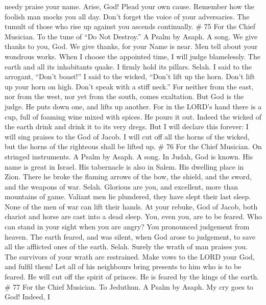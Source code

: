 needy praise your name.  Arise, God! Plead your own cause.
Remember how the foolish man mocks you all day.  Don't
forget the voice of your adversaries. The tumult of those who rise up
against you ascends continually. \# 75 For the Chief Musician. To the
tune of ``Do Not Destroy.'' A Psalm by Asaph. A song.  We
give thanks to you, God. We give thanks, for your Name is near. Men tell
about your wondrous works.  When I choose the appointed
time, I will judge blamelessly.  The earth and all its
inhabitants quake. I firmly hold its pillars. Selah.  I said
to the arrogant, ``Don't boast!'' I said to the wicked, ``Don't lift up
the horn.  Don't lift up your horn on high. Don't speak with
a stiff neck.''  For neither from the east, nor from the
west, nor yet from the south, comes exaltation.  But God is
the judge. He puts down one, and lifts up another.  For in
the LORD's hand there is a cup, full of foaming wine mixed with spices.
He pours it out. Indeed the wicked of the earth drink and drink it to
its very dregs.  But I will declare this forever: I will
sing praises to the God of Jacob.  I will cut off all the
horns of the wicked, but the horns of the righteous shall be lifted up.
\# 76 For the Chief Musician. On stringed instruments. A Psalm by Asaph.
A song.  In Judah, God is known. His name is great in
Israel.  His tabernacle is also in Salem. His dwelling place
in Zion.  There he broke the flaming arrows of the bow, the
shield, and the sword, and the weapons of war. Selah. 
Glorious are you, and excellent, more than mountains of game.
 Valiant men lie plundered, they have slept their last
sleep. None of the men of war can lift their hands.  At your
rebuke, God of Jacob, both chariot and horse are cast into a dead sleep.
 You, even you, are to be feared. Who can stand in your
sight when you are angry?  You pronounced judgement from
heaven. The earth feared, and was silent,  when God arose to
judgement, to save all the afflicted ones of the earth. Selah.
 Surely the wrath of man praises you. The survivors of your
wrath are restrained.  Make vows to the LORD your God, and
fulfil them! Let all of his neighbours bring presents to him who is to
be feared.  He will cut off the spirit of princes. He is
feared by the kings of the earth. \# 77 For the Chief Musician. To
Jeduthun. A Psalm by Asaph.  My cry goes to God! Indeed, I
